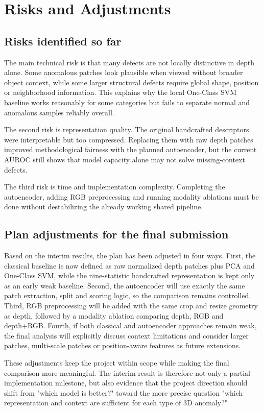 \section{Risks and Adjustments}

\subsection*{Risks identified so far}
The main technical risk is that many defects are not locally distinctive in depth alone. Some anomalous patches look plausible when viewed without broader object context, while some larger structural defects require global shape, position or neighborhood information. This explains why the local One-Class SVM baseline works reasonably for some categories but fails to separate normal and anomalous samples reliably overall.

The second risk is representation quality. The original handcrafted descriptors were interpretable but too compressed. Replacing them with raw depth patches improved methodological fairness with the planned autoencoder, but the current AUROC still shows that model capacity alone may not solve missing-context defects.

The third risk is time and implementation complexity. Completing the autoencoder, adding RGB preprocessing and running modality ablations must be done without destabilizing the already working shared pipeline.

\subsection*{Plan adjustments for the final submission}
Based on the interim results, the plan has been adjusted in four ways. First, the classical baseline is now defined as raw normalized depth patches plus PCA and One-Class SVM, while the nine-statistic handcrafted representation is kept only as an early weak baseline. Second, the autoencoder will use exactly the same patch extraction, split and scoring logic, so the comparison remains controlled. Third, RGB preprocessing will be added with the same crop and resize geometry as depth, followed by a modality ablation comparing depth, RGB and depth+RGB. Fourth, if both classical and autoencoder approaches remain weak, the final analysis will explicitly discuss context limitations and consider larger patches, multi-scale patches or position-aware features as future extensions.

These adjustments keep the project within scope while making the final comparison more meaningful. The interim result is therefore not only a partial implementation milestone, but also evidence that the project direction should shift from "which model is better?" toward the more precise question "which representation and context are sufficient for each type of 3D anomaly?"
